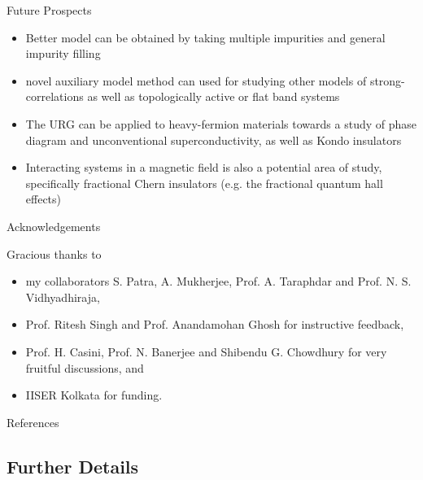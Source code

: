 \documentclass[8pt,aspectratio=169]{beamer}
\begin{document}
\begin{frame}{Future Prospects}
\begin{itemize}
	\item Better model can be obtained by taking multiple impurities and general impurity filling\\[20pt]
\item novel auxiliary model method can used for studying other models of strong-correlations as well as topologically active or flat band systems\\[20pt]
\item The URG can be applied to heavy-fermion materials towards a study of phase diagram and unconventional superconductivity, as well as Kondo insulators\\[20pt]
\item Interacting systems in a magnetic field is also a potential area of study, specifically fractional Chern insulators (e.g. the fractional quantum hall effects)
\end{itemize}
\end{frame}


\begin{frame}{Acknowledgements}

\flushleft
Gracious thanks to\\[10pt]
\begin{itemize}
	\item my collaborators S. Patra, A. Mukherjee, Prof. A. Taraphdar and Prof. N. S. Vidhyadhiraja,
	\item Prof. Ritesh Singh and Prof. Anandamohan Ghosh for instructive feedback,
	\item Prof. H. Casini, Prof. N. Banerjee and Shibendu G. Chowdhury for very fruitful discussions, and
	\item IISER Kolkata for funding.
\end{itemize}

\end{frame}

\appendix

\begin{frame}[allowframebreaks]{References}
\printbibliography[heading=none]
\end{frame}

\begin{frame}{}
\section{Further Details}
\end{frame}
\end{document}
